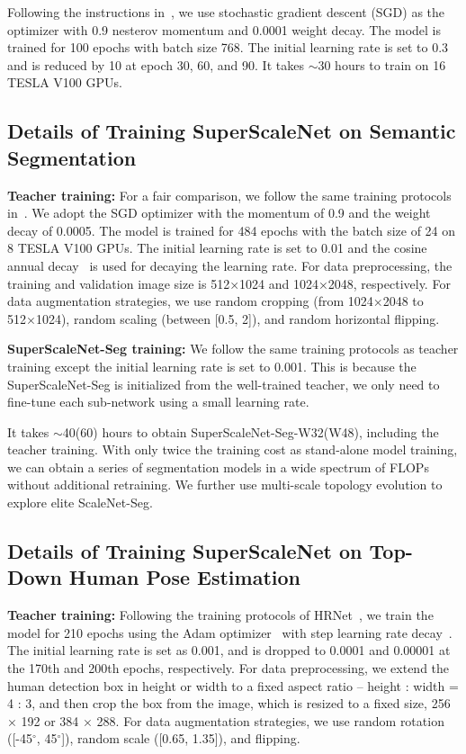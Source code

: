 \documentclass[final]{cvpr}
\newcommand{\netname}{ScaleNet\xspace}
\newcommand{\supernet}{SuperScaleNet\xspace}
\begin{document}
Following the instructions in~\cite{wang2020deep}, we use stochastic gradient descent (SGD) as the optimizer with 0.9 nesterov momentum and 0.0001 weight decay. The model is trained for 100 epochs with batch size 768. The initial learning rate is set to 0.3 and is reduced by 10 at epoch 30, 60, and 90. It takes $\sim$30 hours to train on 16 TESLA V100 GPUs.

\subsection{Details of Training \supernet on Semantic Segmentation}
\label{semantic_seg_training_details}

\textbf{Teacher training:} For a fair comparison, we follow the same training protocols in~\cite{wang2020deep}. We adopt the SGD optimizer with the momentum of 0.9 and the weight decay of 0.0005. The model is trained for 484 epochs with the batch size of 24 on 8 TESLA V100 GPUs. The initial learning rate is set to 0.01 and the cosine annual decay~\cite{loshchilov2016sgdr} is used for decaying the learning rate. For data preprocessing, the training and validation image size is 512×1024 and 1024×2048, respectively. For data augmentation strategies, we use random cropping (from 1024×2048 to 512×1024), random scaling (between [0.5, 2]), and random horizontal flipping.

\textbf{SuperScaleNet-Seg training:} We follow the same training protocols as teacher training except the initial learning rate is set to 0.001. 
This is because the SuperScaleNet-Seg is initialized from the well-trained teacher, we only need to fine-tune each sub-network using a small learning rate.

It takes $\sim$40(60) hours to obtain \supernet-Seg-W32(W48), including the teacher training. With only twice the training cost as stand-alone model training, we can obtain a series of segmentation models in a wide spectrum of FLOPs without additional retraining. We further use multi-scale topology evolution to explore elite \netname-Seg. 

\subsection{Details of Training \supernet on Top-Down Human Pose Estimation}

\textbf{Teacher training:} Following the training protocols of HRNet~\cite{wang2020deep}, we train the model for 210 epochs using the Adam optimizer~\cite{kingma2014adam} with step learning rate decay~\cite{xiao2018simple, wang2020deep}. The initial learning rate is set as 0.001, and is dropped to 0.0001 and 0.00001 at the 170th and 200th epochs, respectively. For data preprocessing, we extend the human detection box in height or width to a fixed aspect ratio -- height : width = 4 : 3, and then crop the box from the image, which is resized to a fixed size, 256 × 192 or 384 × 288. For data augmentation strategies, we use random rotation ([-45$^{\circ}$, 45$^{\circ}$]), random scale ([0.65, 1.35]), and flipping.
\end{document}
